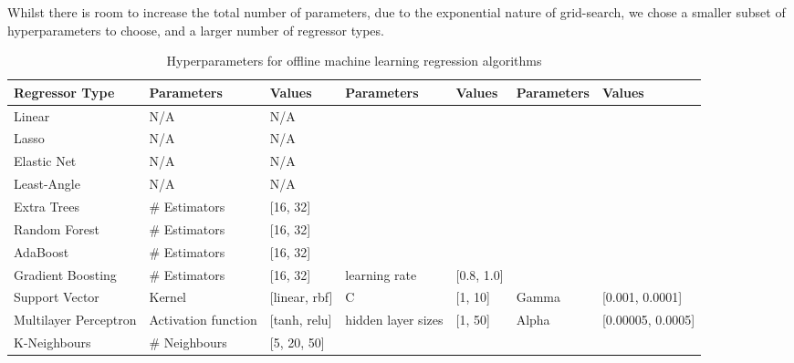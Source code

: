 \documentclass[final,3p,times,twocolumn,numbers]{elsarticle}
\begin{document}
Whilst there is room to increase the total number of parameters, due to the exponential nature of grid-search, we chose a smaller subset of hyperparameters to choose, and a larger number of regressor types.




\begin{table}[]
\begin{tabular}{@{}lllllll@{}}
\toprule
\textbf{Regressor Type} & \textbf{Parameters} & \textbf{Values}   & \textbf{Parameters} & \textbf{Values} & \textbf{Parameters} & \textbf{Values}       \\ \midrule
Linear                  & N/A                 & N/A               &                     &                 &                     &                       \\
Lasso                   & N/A                 & N/A               &                     &                 &                     &                       \\
Elastic Net             & N/A                 & N/A               &                     &                 &                     &                       \\
Least-Angle             & N/A                 & N/A               &                     &                 &                     &                       \\
Extra Trees             & \# Estimators       & {[}16, 32{]}      &                     &                 &                     &                       \\
Random Forest           & \# Estimators       & {[}16, 32{]}      &                     &                 &                     &                       \\
AdaBoost                & \# Estimators       & {[}16, 32{]}      &                     &                 &                     &                       \\
Gradient Boosting       & \# Estimators       & {[}16, 32{]}      & learning rate       & {[}0.8, 1.0{]}  &                     &                       \\
Support Vector          & Kernel              & {[}linear, rbf{]} & C                   & {[}1, 10{]}     & Gamma               & {[}0.001, 0.0001{]}   \\
Multilayer Perceptron   & Activation function & {[}tanh, relu{]}  & hidden layer sizes  & {[}1, 50{]}     & Alpha               & {[}0.00005, 0.0005{]} \\
K-Neighbours            & \# Neighbours       & {[}5, 20, 50{]}   &                     &                 &                     &                       \\ \bottomrule
\end{tabular}
\caption{Hyperparameters for offline machine learning regression algorithms}
\label{table:hyperparameter-tuning-offline}
\end{table}
\end{document}
